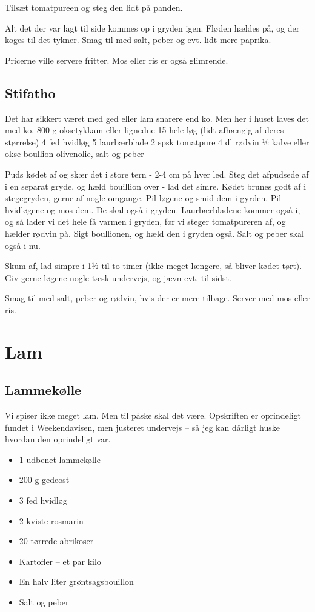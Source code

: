 \documentclass[
]{book}
\providecommand{\tightlist}{%
  \setlength{\itemsep}{0pt}\setlength{\parskip}{0pt}}
\begin{document}
Tilsæt tomatpureen og steg den lidt på panden.

Alt det der var lagt til side kommes op i gryden
igen. Fløden hældes på, og der koges til det
tykner. Smag til med salt, peber og evt. lidt
mere paprika.

Pricerne ville servere fritter. Mos eller ris
er også glimrende.

\section{Stifatho}\label{stifatho}

Det har sikkert været med ged eller lam snarere end ko. Men her i huset laves det med ko.
800 g oksetykkam eller lignedne
15 hele løg (lidt afhængig af deres størrelse)
4 fed hvidløg
5 laurbærblade
2 spsk tomatpure
4 dl rødvin
½ kalve eller okse boullion
olivenolie, salt og peber

Puds kødet af og skær det i store tern - 2-4 cm på hver led.
Steg det afpudsede af i en separat gryde, og hæld bouillion over - lad det
simre.
Kødet brunes godt af i stegegryden, gerne af nogle omgange.
Pil løgene og smid dem i gyrden.
Pil hvidløgene og mos dem. De skal også i gryden.
Laurbærbladene kommer også i, og så lader vi det hele få varmen i gryden,
før vi steger tomatpureren af, og hælder rødvin på.
Sigt boullionen, og hæld den i gryden også. Salt og peber skal også i nu.

Skum af, lad simpre i 1½ til to timer (ikke meget længere, så bliver kødet
tørt). Giv gerne løgene nogle tæsk undervejs, og jævn evt. til sidst.

Smag til med salt, peber og rødvin, hvis der er mere tilbage. Server med mos eller
ris.

\chapter{Lam}\label{lam}

\section{Lammekølle}\label{lammekuxf8lle}

Vi spiser ikke meget lam. Men til påske skal det være. Opskriften er oprindeligt fundet i Weekendavisen, men justeret undervejs -- så jeg kan dårligt huske hvordan den oprindeligt var.

\begin{itemize}
\tightlist
\item
  1 udbenet lammekølle
\item
  200 g gedeost
\item
  3 fed hvidløg
\item
  2 kviste rosmarin
\item
  20 tørrede abrikoser
\item
  Kartofler -- et par kilo
\item
  En halv liter grøntsagsbouillon
\item
  Salt og peber
\end{itemize}
\end{document}
